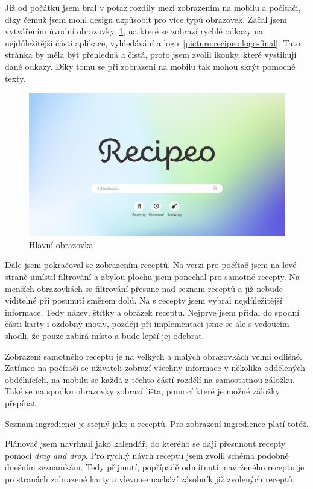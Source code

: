 Již od počátku jsem bral v potaz rozdíly mezi zobrazením na mobilu a počítači, díky čemuž jsem mohl design uzpůsobit
pro více typů obrazovek. Začal jsem vytvářením úvodní obrazovky~\ref{picture:recipeo:main-page}, na které se zobrazí rychlé odkazy na nejdůležitější části
aplikace, vyhledávání a logo~\ref{picture:recipeo:logo-final}. Tato stránka by měla být přehledná a čistá, proto jsem zvolil ikonky, které vystihují dané
odkazy. Díky tomu se při zobrazení na mobilu tak mohou skrýt pomocné texty.

\begin{figure}
    \includegraphics[width=\textwidth]{images/main-page}
    \caption{Hlavní obrazovka} \label{picture:recipeo:main-page}
\end{figure}

Dále jsem pokračoval se zobrazením receptů. Na verzi pro počítač jsem na levé straně umístil filtrování a zbylou plochu jsem ponechal
pro samotné recepty. Na menších obrazovkách se filtrování přesune nad seznam receptů a již nebude viditelné při posunutí směrem dolů.
Na  s recepty jsem vybral nejdůležitější informace. Tedy název, štítky a obrázek receptu. Nejprve jsem přidal do spodní části
karty i ozdobný motiv, později při implementaci jsme se ale s vedoucím shodli, že pouze zabírá místo a bude lepší jej odebrat.

Zobrazení samotného receptu je na velkých a malých obrazovkách velmi odlišné. Zatímco na počítači se uživateli zobrazí všechny
informace v několika oddělených obdélnících, na mobilu se každá z těchto částí rozdělí na samostatnou záložku. Také se na spodku
obrazovky zobrazí lišta, pomocí které je možné záložky přepínat.

Seznam ingrediencí je stejný jako u receptů. Pro zobrazení ingredience platí totéž.

Plánovač jsem navrhnul jako kalendář, do kterého se dají přesunout recepty pomocí \emph{drag and drop}. Pro rychlý návrh receptu
jsem zvolil schéma podobné dnešním seznamkám. Tedy přijmutí, popřípadě odmítnutí, navrženého receptu je po stranách zobrazené karty
a vlevo se nachází zásobník již zvolených receptů.

